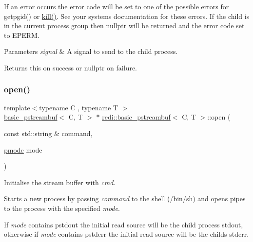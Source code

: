 If an error occurs the error code will be set to one of the possible errors for {\ttfamily getpgid()} or {\ttfamily \mbox{\hyperlink{classredi_1_1basic__pstreambuf_a6648f57f7aa212f986365101a66d5350}{kill()}}}. See your system\textquotesingle{}s documentation for these errors. If the child is in the current process group then nullptr will be returned and the error code set to E\+P\+E\+RM.


\begin{DoxyParams}{Parameters}
{\em signal} & A signal to send to the child process. \\
\hline
\end{DoxyParams}
\begin{DoxyReturn}{Returns}
{\ttfamily this} on success or {\ttfamily nullptr} on failure. 
\end{DoxyReturn}
\mbox{\label{classredi_1_1basic__pstreambuf_ac91e4317d9e95b4551513a00e3d82996}} 
\subsubsection{\texorpdfstring{open()}{open()}\hspace{0.1cm}{\footnotesize\ttfamily [1/2]}}
{\footnotesize\ttfamily template$<$typename C , typename T $>$ \\
\mbox{\hyperlink{classredi_1_1basic__pstreambuf}{basic\+\_\+pstreambuf}}$<$ C, T $>$ $\ast$ \mbox{\hyperlink{classredi_1_1basic__pstreambuf}{redi\+::basic\+\_\+pstreambuf}}$<$ C, T $>$\+::open (\begin{DoxyParamCaption}\item[{const std\+::string \&}]{command,  }\item[{\mbox{\hyperlink{structredi_1_1pstreams_a1eae4aad88812af03a0fbb3ec13c50b7}{pmode}}}]{mode }\end{DoxyParamCaption})}



Initialise the stream buffer with {\itshape cmd}. 

Starts a new process by passing {\itshape command} to the shell (/bin/sh) and opens pipes to the process with the specified {\itshape mode}.

If {\itshape mode} contains {\ttfamily pstdout} the initial read source will be the child process\textquotesingle{} stdout, otherwise if {\itshape mode} contains {\ttfamily pstderr} the initial read source will be the child\textquotesingle{}s stderr.

